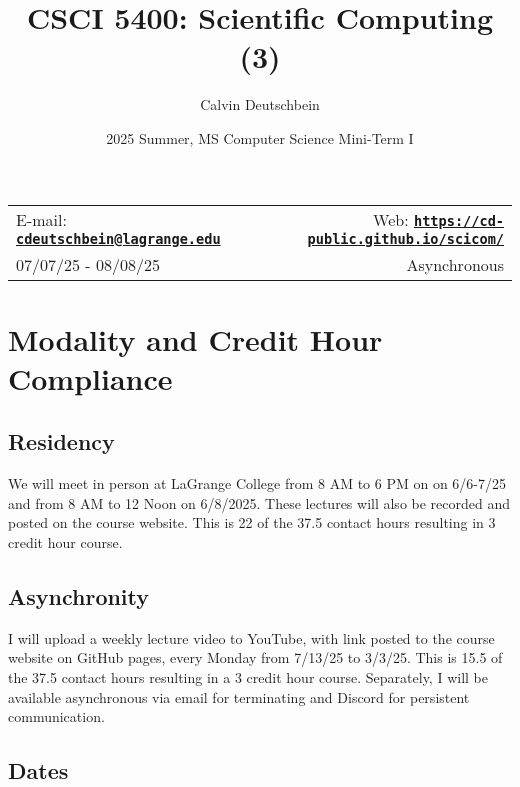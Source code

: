 \documentclass[11pt]{article}
\title{CSCI 5400: Scientific Computing (3)}
\author{Calvin Deutschbein}
\date{2025 Summer, MS Computer Science Mini-Term I}
\newcommand{\blankline}{\quad\pagebreak[2]}
\begin{document}
\maketitle

\blankline

\begin{tabular*}{\textwidth}{@{\extracolsep{\fill}}lr}


E-mail: \href{mailto:cdeutschbein@lagrange.edu}{\tt\bf cdeutschbein@lagrange.edu} & Web: \href{https://cd-public.github.io/scicom/}{\tt\bf https://cd-public.github.io/scicom/}  \\

07/07/25 - 08/08/25 &  Asynchronous \\
\hline
\end{tabular*}

\vspace{5 mm}


\section*{Modality and Credit Hour Compliance}

\subsection*{Residency}  

We will meet in person at LaGrange College from 8 AM to 6 PM on on 6/6-7/25
and from 8 AM to 12 Noon on 6/8/2025. These lectures will also be recorded and posted on
the course website. This is 22 of the 37.5 contact hours resulting in 3 credit hour course.

\subsection*{Asynchronity} 

I will upload a weekly lecture video to YouTube, with link posted to the course
website on GitHub pages, every Monday from 7/13/25 to 3/3/25. This is 15.5 of the 37.5 contact
hours resulting in a 3 credit hour course. Separately, I will be available asynchronous via email
for terminating and Discord for persistent communication.

\subsection*{Dates}
\end{document}
